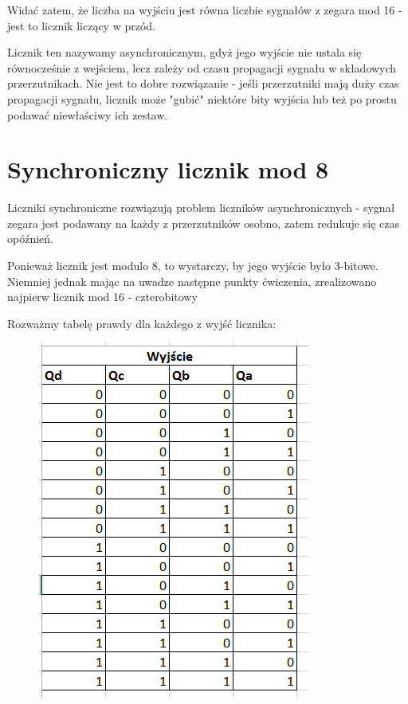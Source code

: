 \documentclass[12pt,a4paper]{article}
\begin{document}
Widać zatem, że liczba na wyjściu jest równa liczbie sygnałów z zegara mod 16 - jest to licznik liczący w przód.

\par
Licznik ten nazywamy asynchronicznym, gdyż jego wyjście nie ustala się równocześnie z wejściem, lecz zależy od czasu propagacji sygnału w składowych przerzutnikach. Nie jest to dobre rozwiązanie - jeśli przerzutniki mają duży czas propagacji sygnału, licznik może "gubić" niektóre bity wyjścia lub też po prostu podawać niewłaściwy ich zestaw.

\section{Synchroniczny licznik mod 8}

Liczniki synchroniczne rozwiązują problem liczników asynchronicznych - sygnał zegara jest podawany na każdy z przerzutników osobno, zatem redukuje się czas opóźnień.



Ponieważ licznik jest modulo 8, to wystarczy, by jego wyjście było 3-bitowe.
Niemniej jednak mając na uwadze następne punkty ćwiczenia, zrealizowano najpierw licznik mod 16 - czterobitowy

Rozważmy tabelę prawdy dla każdego z wyjść licznika:

\begin{figure}[H]
\centering
\includegraphics{img/4c_table_4bit}
\end{figure}
\end{document}
